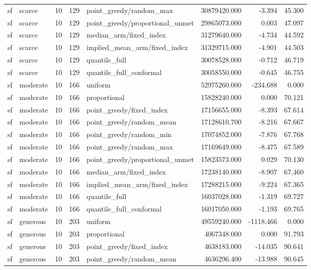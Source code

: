 \begin{tabular}{llrrlrrr}
sf & scarce & 10 & 129 & point\_greedy/random\_max & 30879420.000 & -3.394 & 45.300 \\
sf & scarce & 10 & 129 & point\_greedy/proportional\_unmet & 29865073.000 & 0.003 & 47.097 \\
sf & scarce & 10 & 129 & median\_arm/fixed\_index & 31279640.000 & -4.734 & 44.592 \\
sf & scarce & 10 & 129 & implied\_mean\_arm/fixed\_index & 31329715.000 & -4.901 & 44.503 \\
sf & scarce & 10 & 129 & quantile\_full & 30078528.000 & -0.712 & 46.719 \\
sf & scarce & 10 & 129 & quantile\_full\_conformal & 30058550.000 & -0.645 & 46.755 \\
sf & moderate & 10 & 166 & uniform & 52975260.000 & -234.688 & 0.000 \\
sf & moderate & 10 & 166 & proportional & 15828240.000 & 0.000 & 70.121 \\
sf & moderate & 10 & 166 & point\_greedy/fixed\_index & 17156655.000 & -8.393 & 67.614 \\
sf & moderate & 10 & 166 & point\_greedy/random\_mean & 17128610.700 & -8.216 & 67.667 \\
sf & moderate & 10 & 166 & point\_greedy/random\_min & 17074852.000 & -7.876 & 67.768 \\
sf & moderate & 10 & 166 & point\_greedy/random\_max & 17169649.000 & -8.475 & 67.589 \\
sf & moderate & 10 & 166 & point\_greedy/proportional\_unmet & 15823573.000 & 0.029 & 70.130 \\
sf & moderate & 10 & 166 & median\_arm/fixed\_index & 17238140.000 & -8.907 & 67.460 \\
sf & moderate & 10 & 166 & implied\_mean\_arm/fixed\_index & 17288215.000 & -9.224 & 67.365 \\
sf & moderate & 10 & 166 & quantile\_full & 16037028.000 & -1.319 & 69.727 \\
sf & moderate & 10 & 166 & quantile\_full\_conformal & 16017050.000 & -1.193 & 69.765 \\
sf & generous & 10 & 203 & uniform & 49559240.000 & -1118.466 & 0.000 \\
sf & generous & 10 & 203 & proportional & 4067348.000 & 0.000 & 91.793 \\
sf & generous & 10 & 203 & point\_greedy/fixed\_index & 4638183.000 & -14.035 & 90.641 \\
sf & generous & 10 & 203 & point\_greedy/random\_mean & 4636296.400 & -13.988 & 90.645 \\

\end{tabular}

